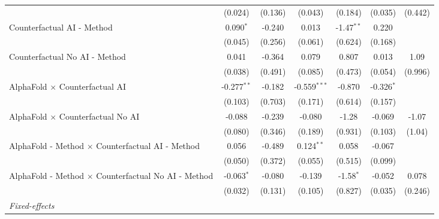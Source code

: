 \begin{tabular}{lcccccc}
                                                              & (0.024)       & (0.136)       & (0.043)        & (0.184)      & (0.035)       & (0.442)\\   
   Counterfactual AI - Method                                 & 0.090$^{*}$   & -0.240        & 0.013          & -1.47$^{**}$ & 0.220         &   \\   
                                                              & (0.045)       & (0.256)       & (0.061)        & (0.624)      & (0.168)       &   \\   
   Counterfactual No AI - Method                              & 0.041         & -0.364        & 0.079          & 0.807        & 0.013         & 1.09\\   
                                                              & (0.038)       & (0.491)       & (0.085)        & (0.473)      & (0.054)       & (0.996)\\   
   AlphaFold $\times$ Counterfactual AI                       & -0.277$^{**}$ & -0.182        & -0.559$^{***}$ & -0.870       & -0.326$^{*}$  &   \\   
                                                              & (0.103)       & (0.703)       & (0.171)        & (0.614)      & (0.157)       &   \\   
   AlphaFold $\times$ Counterfactual No AI                    & -0.088        & -0.239        & -0.080         & -1.28        & -0.069        & -1.07\\   
                                                              & (0.080)       & (0.346)       & (0.189)        & (0.931)      & (0.103)       & (1.04)\\   
   AlphaFold - Method $\times$ Counterfactual AI - Method     & 0.056         & -0.489        & 0.124$^{**}$   & 0.058        & -0.067        &   \\   
                                                              & (0.050)       & (0.372)       & (0.055)        & (0.515)      & (0.099)       &   \\   
   AlphaFold - Method $\times$ Counterfactual No AI - Method  & -0.063$^{*}$  & -0.080        & -0.139         & -1.58$^{*}$  & -0.052        & 0.078\\   
                                                              & (0.032)       & (0.131)       & (0.105)        & (0.827)      & (0.035)       & (0.246)\\   
   \midrule
   \emph{Fixed-effects}\\

\end{tabular}
